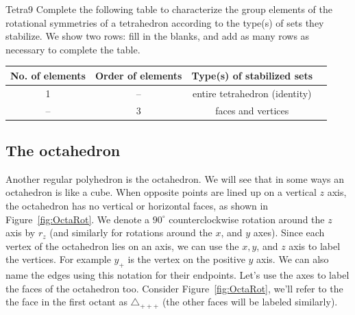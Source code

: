 \begin{exercise}{Tetra9}
Complete the following table to characterize the group elements of the rotational symmetries of a tetrahedron according to the type(s) of sets they stabilize.  We show two rows: fill in the blanks, and add as many rows as necessary to complete the table.
  
\begin{tabular}{| c |c|c| r |} \hline
 \textbf{No. of elements} & \textbf{Order of elements} & \textbf{Type(s) of stabilized sets} \\ \hline
  1&  --& entire tetrahedron (identity) \\ \hline
  -- & 3& faces and vertices \\   
\end{tabular}

\end{exercise}
\subsection{The octahedron}
Another regular polyhedron is the octahedron.  We will see that in some ways an octahedron is like a cube. 
When opposite points are lined up  on a vertical $z$ axis, the octahedron has no vertical or horizontal faces, as shown in Figure~\ref{fig:OctaRot}.  We denote a  $90^{\circ}$ counterclockwise rotation around the $z$ axis by $r_z$ (and similarly for rotations around the $x$, and $y$ axes).
Since each vertex of the octahedron lies on an axis, we can use the $x,y$, and $z$ axis to label the vertices.  For example $y_+$ is the vertex on the positive $y$ axis.   We can also name the edges using this notation for their endpoints.   Let's use the axes to label the faces of the octahedron too.  Consider Figure~\ref{fig:OctaRot}, we'll refer to the the face in the first octant as $\triangle_{ +++}$ (the other faces will be labeled similarly).

